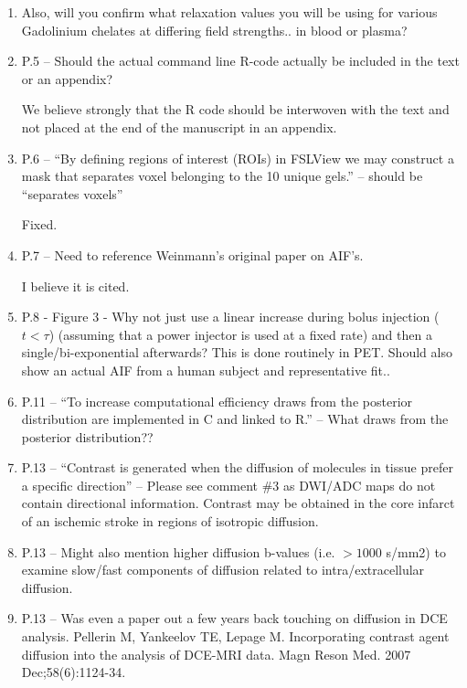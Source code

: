 \documentclass[11pt]{article}
\begin{document}
\begin{enumerate}
\item Also, will you confirm what relaxation values you will be using
  for various Gadolinium chelates at differing field strengths.. in
  blood or plasma?

\item P.5 – Should the actual command line R-code actually be included
  in the text or an appendix?

  We believe strongly that the \textsf{R} code should be interwoven
  with the text and not placed at the end of the manuscript in an
  appendix.

\item P.6 – ``By defining regions of interest (ROIs) in FSLView we may
  construct a mask that separates voxel belonging to the 10 unique
  gels.'' – should be ``separates voxels''

  Fixed.

\item P.7 – Need to reference Weinmann’s original paper on AIF's.

  I believe it is cited.

\item P.8 - Figure 3 - Why not just use a linear increase during bolus
  injection ($t<\tau$) (assuming that a power injector is used at a
  fixed rate) and then a single/bi-exponential afterwards?  This is
  done routinely in PET.  Should also show an actual AIF from a human
  subject and representative fit..

  

\item P.11 – ``To increase computational efficiency draws from the
  posterior distribution are implemented in C and linked to R.'' –
  What draws from the posterior distribution??

\item P.13 – ``Contrast is generated when the diffusion of molecules
  in tissue prefer a specific direction'' – Please see comment \#3 as
  DWI/ADC maps do not contain directional information.  Contrast may
  be obtained in the core infarct of an ischemic stroke in regions of
  isotropic diffusion.

\item P.13 – Might also mention higher diffusion b-values
  (i.e. $>1000$ s/mm2) to examine slow/fast components of diffusion
  related to intra/extracellular diffusion.

\item P.13 – Was even a paper out a few years back touching on
  diffusion in DCE analysis.  Pellerin M, Yankeelov TE, Lepage
  M. Incorporating contrast agent diffusion into the analysis of
  DCE-MRI data. Magn Reson Med. 2007 Dec;58(6):1124-34.


\end{enumerate}
\end{document}
